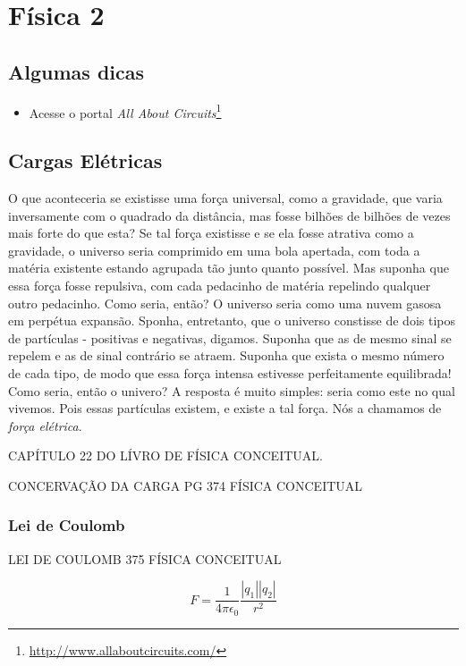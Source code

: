 \chapter{Física 2}

\section*{Algumas dicas}
\begin{itemize}
    \item Acesse o portal \textit{All About Circuits}\footnote{\url{http://www.allaboutcircuits.com/}}
\end{itemize}


\section{Cargas Elétricas}
O que aconteceria se existisse uma força universal, como a gravidade, que varia inversamente com o quadrado da distância, mas fosse bilhões de bilhões de vezes mais forte do que esta? Se tal força existisse e se ela fosse atrativa como a gravidade, o universo seria comprimido em uma bola apertada, com toda a matéria existente estando agrupada tão junto quanto possível. Mas suponha que essa força fosse repulsiva, com cada pedacinho de matéria repelindo qualquer outro pedacinho. Como seria, então? O universo seria como uma nuvem gasosa em perpétua expansão. Sponha, entretanto, que o universo constisse de dois tipos de partículas - positivas e negativas, digamos. Suponha que as de mesmo sinal se repelem e as de sinal contrário se atraem. Suponha que exista o mesmo número de cada tipo, de modo que essa força intensa estivesse perfeitamente equilibrada! Como seria, então o univero? A resposta é muito simples: seria como este no qual vivemos. Pois essas partículas existem, e existe a tal força. Nós a chamamos de \textit{força elétrica}.

CAPÍTULO 22 DO LÍVRO DE FÍSICA CONCEITUAL.

CONCERVAÇÃO DA CARGA PG 374 FÍSICA CONCEITUAL

\subsection{Lei de Coulomb}

LEI DE COULOMB 375 FÍSICA CONCEITUAL

\begin{equation}\label{18.1}
    F=\dfrac{1}{4\pi \epsilon_0} \dfrac{|q_1||q_2|}{r^2}
\end{equation}

